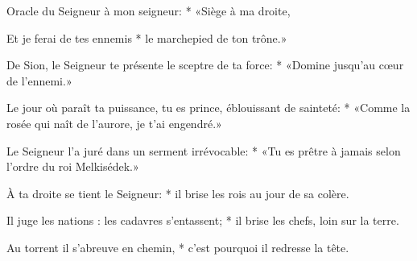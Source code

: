 \item Oracle du Seigneur à mon seigneur: *
   «Siège à ma droite,

\item Et je ferai de tes ennemis * 
   le marchepied de ton trône.»

\item De Sion, le Seigneur te présente
   le sceptre de ta force: * 
«Domine jusqu'au cœur de l'ennemi.»

\item Le jour où paraît ta puissance,
   tu es prince, éblouissant de sainteté: *
«Comme la rosée qui naît de l'aurore,
   je t'ai engendré.»

\item Le Seigneur l'a juré
   dans un serment irrévocable: *
«Tu es prêtre à jamais
   selon l'ordre du roi Melkisédek.»

\item À ta droite se tient le Seigneur: *
il brise les rois au jour de sa colère.

\item Il juge les nations : les cadavres s'entassent; * il brise les chefs, loin sur la terre.

\item Au torrent il s'abreuve en chemin, *
c'est pourquoi il redresse la tête.